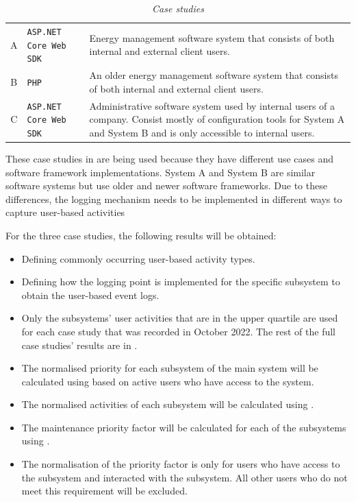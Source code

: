 \begin{table}[!htb]
	\centering
	\caption[Case studies]
	{\textit{Case studies}}
	\label{tbl:ch3_caseStudies}
	\begin{tabularx}{\textwidth}{clX}
		\toprule
		\thead{Case study} & \thead{Software framework} & \thead{Description} \\
		\midrule
		\rowcolor{lightgray}
		A & \texttt{ASP.NET Core Web SDK} & \RaggedRight Energy management software system that consists of both internal and external client users. \\
		B & \texttt{PHP} & \RaggedRight An older energy management software system that consists of both internal and external client users. \\
		\rowcolor{lightgray}
		C & \texttt{ASP.NET Core Web SDK} & \RaggedRight Administrative software system used by internal users of a company. Consist mostly of configuration tools for System A and System B and is only accessible to internal users. \\
		\bottomrule
	\end{tabularx}
\end{table}

These case studies in  are being used because they have different use cases and software framework implementations. System A and System B are similar software systems but use older and newer software frameworks. Due to these differences, the logging mechanism needs to be implemented in different ways to capture user-based activities\par For the three case studies, the following results will be obtained:

\begin{itemize}
\item Defining commonly occurring user-based activity types.
\item Defining how the logging point is implemented for the specific subsystem to obtain the user-based event logs.
\item Only the subsystems' user activities that are in the upper quartile are used for each case study that was recorded in October 2022. The rest of the full case studies' results are in .
\item The normalised priority for each subsystem of the main system will be calculated using  based on active users who have access to the system.
\item The normalised activities of each subsystem will be calculated using .
\item The maintenance priority factor will be calculated for each of the subsystems using .
\item The normalisation of the priority factor is only for users who have access to the subsystem and interacted with the subsystem. All other users who do not meet this requirement will be excluded.
\end{itemize}

